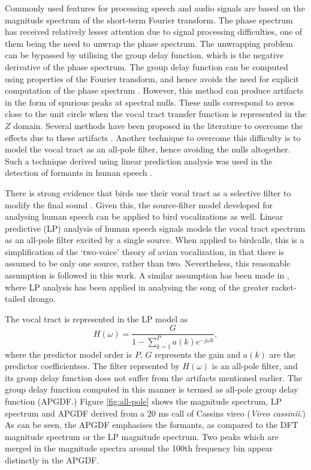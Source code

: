 \documentclass[a4paper]{article}
\begin{document}
Commonly used features for processing speech and audio signals are based on the
magnitude spectrum of the short-term Fourier transform. The phase spectrum has
received relatively lesser attention due to signal processing difficulties, one
of them being the need to unwrap the phase spectrum. The unwrapping problem can be
bypassed by utilising the group delay function, which is the negative derivative
of the phase spectrum. The group delay function can be
computed using properties of the Fourier transform, and hence avoids the need
for explicit computation of the phase spectrum \cite{gdDeriv}. 
However, this method can produce
artifacts in the form of spurious peaks at spectral nulls. These nulls
correspond to zeros close to the unit circle when the vocal tract transfer
function is represented in the $Z$ domain. 
Several methods have been proposed in the literature to overcome the effects due
to these artifacts \cite{modgdf} \cite{productSpectrum}. Another technique to overcome
this difficulty is to model the vocal tract as an all-pole filter, hence
avoiding the nulls altogether. Such a
technique derived using linear prediction analysis was used in the detection of
formants in human speech \cite{yegnaFormant}. 


There is strong evidence that birds use their vocal tract as a selective filter
to modify the final sound \cite{catchpole}.  Given this, the source-filter model
developed for analysing human speech can be applied to bird vocalizations as
well.  Linear predictive (LP) analysis of human speech signals models the vocal
tract spectrum as an all-pole filter \cite{makhoul} excited by a single source.
When applied to birdcalls, this is a simplification of the `two-voice' theory of
avian vocalization\cite{catchpole}, in that there is assumed to be only one
source, rather than two. Nevertheless, this reasonable assumption is followed in
this work. A similar assumption has been made in \cite{agnihotri}, where LP
analysis has been applied in analysing the song of the greater racket-tailed
drongo.

The vocal tract is represented in the LP model as
\begin{equation}
H(\omega) = \frac{G}{1-\sum_{k=1}^{P} a(k) e^{-j \omega k}},
\end{equation}
where the predictor model order is $P$, $G$ represents the gain and $a(k)$ are
the predictor coefficientses\cite{makhoul}.
The filter reprsented by $H(\omega)$ is an all-pole filter, and its group delay
function does not suffer from the artifacts mentioned earlier. The group delay
function computed in this manner is termed as all-pole group delay
function (APGDF.) Figure \ref{fig:all-pole} shows the magnitude spectrum, LP
spectrum and APGDF derived from a 20 ms call of Cassins vireo (\textit{Vireo
cassinii.}) As can be seen, the APGDF emphasises the formants, as compared to the
DFT magnitude spectrum or the LP magnitude spectrum. Two peaks which are merged
in the magnitude spectra around the 100th frequency bin appear distinctly in the
APGDF.
\end{document}
